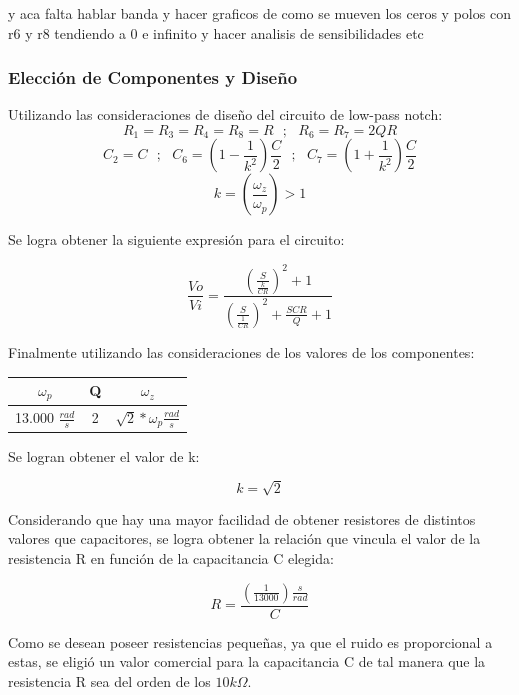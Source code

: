 \documentclass[a4paper]{article}
\begin{document}
y aca falta hablar banda y hacer graficos de como se mueven los ceros y polos con r6 y r8 tendiendo a 0 e infinito y hacer analisis de sensibilidades etc

\subsubsection{Elección de Componentes y Diseño}
\label{sec:eleccion_componentes}

Utilizando las consideraciones de diseño del circuito de low-pass notch:
$$R_1=R_3=R_4=R_8=R \ \ \ ; \ \ \ R_6=R_7=2QR$$
$$C_2=C \ \ \ ; \ \ \ C_6=(1-\frac{1}{k^2})\frac{C}{2}  \ \ \ ; \ \ \ C_7=(1+\frac{1}{k^2})\frac{C}{2}$$
$$k=\left(\frac{\omega_z}{\omega_p} \right) > 1$$

Se logra obtener la siguiente expresión para el circuito:

\begin{equation}
\frac{Vo}{Vi} = \frac{\left(\frac{S}{\frac{k}{C R}}\right)^2 + 1}{\left( \frac{S}{\frac{1}{CR}} \right)^2+\frac{SCR}{Q} + 1}
\label{circ_trans_simple}
\end{equation}

Finalmente utilizando las consideraciones de los valores de los componentes:
\begin{table}[H]
\centering
\begin{tabular}{@{}ccc@{}}
\toprule
$\omega_p$ & Q & $\omega_z$ \\ \midrule
13.000 $\frac{rad}{s}$ & 2 & $\sqrt{2}*\omega_p \frac{rad}{s}$ \\ \bottomrule
\end{tabular}
\end{table}
Se logran obtener el valor de k:

\begin{equation}
k = \sqrt{2}
\end{equation}

Considerando que hay una mayor facilidad de obtener resistores de distintos valores que capacitores, se logra obtener la relación que vincula el valor de la resistencia R en función de la capacitancia C elegida:

\begin{equation}
R = \frac{\left(\frac{1}{13000}\right) \frac{s}{rad}}{C}
\end{equation}

Como se desean poseer resistencias pequeñas, ya que el ruido es proporcional a estas, se eligió un valor comercial para la capacitancia C de tal manera que la resistencia R sea del orden de los $10k\Omega$.
\end{document}
